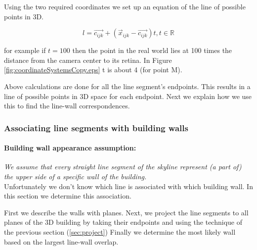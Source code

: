 

	Using the two required coordinates we set up an equation of the
	line of possible points in 3D.  

	 \[ l = \vec{c_{ijk}} + (\vec{x}_{ijk}-\vec{c_{ijk}})t, t \in \mathbb{R} \]

	for example if $t=100$ then the point in the real world lies at 100 times
		the distance from the camera center to its retina.
	In Figure \ref{fig:coordinateSystemsCopy.eps} t is about 4 (for point M).

	Above calculations are done for all the line segment's endpoints.
	This results in a line of possible points in 3D space for each endpoint.
	Next we explain how we use this to find the line-wall correspondences.


\subsubsection{Associating line segments with building walls}
\label{sec:linewallass}
	\paragraph{Building wall appearance assumption:}
	\emph{We assume that every straight line segment of the skyline represent (a
	part of) the upper side of a specific wall of the building.}\\

	Unfortunately we don't know which line is associated with which building
	wall. In this section we determine this association.

	First we describe the walls with planes. Next, we project the line segments to all planes of the 3D building by
	taking their endpoints and using the technique of the previous section (\ref{sec:project})
	Finally we determine the most likely wall based on the largest line-wall overlap. 

